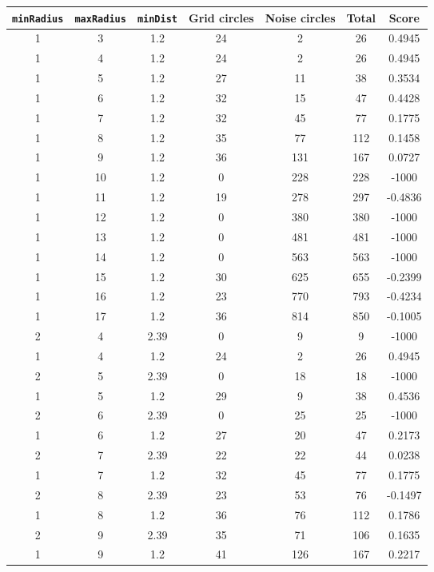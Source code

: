 \documentclass[letterpaper, 12pt]{article}
\begin{document}
\begin{longtable}{|c|c|c|c|c|c|c|}
\hline
\textbf{\texttt{minRadius}} & \textbf{\texttt{maxRadius}} & \textbf{\texttt{minDist}} & \textbf{Grid circles} & \textbf{Noise circles} & \textbf{Total} & \textbf{Score} \\
\hline
1 & 3 & 1.2 & 24 & 2 & 26 & 0.4945 \\
\hline
1 & 4 & 1.2 & 24 & 2 & 26 & 0.4945 \\
\hline
1 & 5 & 1.2 & 27 & 11 & 38 & 0.3534 \\
\hline
1 & 6 & 1.2 & 32 & 15 & 47 & 0.4428 \\
\hline
1 & 7 & 1.2 & 32 & 45 & 77 & 0.1775 \\
\hline
1 & 8 & 1.2 & 35 & 77 & 112 & 0.1458 \\
\hline
1 & 9 & 1.2 & 36 & 131 & 167 & 0.0727 \\
\hline
1 & 10 & 1.2 & 0 & 228 & 228 & -1000 \\
\hline
1 & 11 & 1.2 & 19 & 278 & 297 & -0.4836 \\
\hline
1 & 12 & 1.2 & 0 & 380 & 380 & -1000 \\
\hline
1 & 13 & 1.2 & 0 & 481 & 481 & -1000 \\
\hline
1 & 14 & 1.2 & 0 & 563 & 563 & -1000 \\
\hline
1 & 15 & 1.2 & 30 & 625 & 655 & -0.2399 \\
\hline
1 & 16 & 1.2 & 23 & 770 & 793 & -0.4234 \\
\hline
1 & 17 & 1.2 & 36 & 814 & 850 & -0.1005 \\
\hline
2 & 4 & 2.39 & 0 & 9 & 9 & -1000 \\
\hline
1 & 4 & 1.2 & 24 & 2 & 26 & 0.4945 \\
\hline
2 & 5 & 2.39 & 0 & 18 & 18 & -1000 \\
\hline
1 & 5 & 1.2 & 29 & 9 & 38 & 0.4536 \\
\hline
2 & 6 & 2.39 & 0 & 25 & 25 & -1000 \\
\hline
1 & 6 & 1.2 & 27 & 20 & 47 & 0.2173 \\
\hline
2 & 7 & 2.39 & 22 & 22 & 44 & 0.0238 \\
\hline
1 & 7 & 1.2 & 32 & 45 & 77 & 0.1775 \\
\hline
2 & 8 & 2.39 & 23 & 53 & 76 & -0.1497 \\
\hline
1 & 8 & 1.2 & 36 & 76 & 112 & 0.1786 \\
\hline
2 & 9 & 2.39 & 35 & 71 & 106 & 0.1635 \\
\hline
1 & 9 & 1.2 & 41 & 126 & 167 & 0.2217 \\

\end{longtable}
\end{document}

